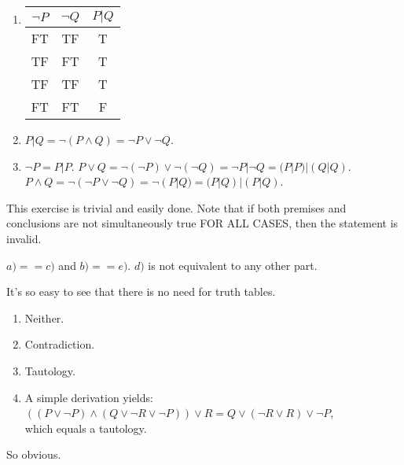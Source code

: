 \begin{exx}
  \begin{enumerate}[label=(\alph*)]
    \item \begin{tabular}{c c c}
      $\lnot P$ & $\lnot Q$ & $P\vert Q$ \\
      \hline
      FT & TF & T \\
      TF & FT & T \\
      TF & TF & T \\
      FT & FT & F
    \end{tabular}
    \item $P\vert Q=\lnot(P\land Q)=\lnot P \lor \lnot Q$.
    \item $\lnot P = P|P$.
    \newline $P\lor Q=\lnot(\lnot P)\lor \lnot(\lnot Q)=\lnot P|\lnot Q=(P|P)|(Q|Q)$.
    \newline $P\land Q=\lnot(\lnot P \lor \lnot Q)=\lnot(P|Q)=(P|Q)|(P|Q)$.
  \end{enumerate}
\end{exx}

\begin{exx}
  This exercise is trivial and easily done. Note that if both premises and conclusions
  are not simultaneously true FOR ALL CASES, then the statement is invalid.
\end{exx}

\begin{exx}
  $a)==c)$ and $b)==e)$. $d)$ is not equivalent to any other part.
\end{exx}

\begin{exx}
  It's so easy to see that there is no need for truth tables.
  \begin{enumerate}[label=(\alph*)]
    \item Neither.
    \item Contradiction.
    \item Tautology.
    \item A simple derivation yields:\\
    $((P\lor \lnot P)\land(Q\lor \lnot R\lor \lnot P))\lor R=Q\lor (\lnot R\lor R)\lor \lnot P$,\\
    which equals a tautology.
  \end{enumerate}
\end{exx}

\begin{exx}
  So obvious.
\end{exx}

